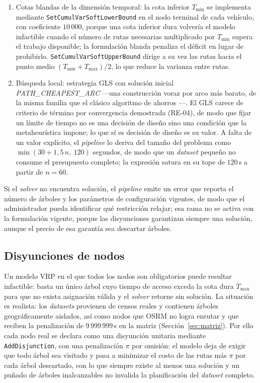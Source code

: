 \begin{enumerate}
  \item Cotas blandas de la dimensión temporal: la cota inferior $T_{\min}$ se implementa mediante
        \texttt{SetCumulVarSoftLowerBound} en el nodo terminal de cada vehículo, con coeficiente
        $10\,000$, porque una cota inferior dura volvería el modelo infactible cuando el número de
        rutas necesarias multiplicado por $T_{\min}$ supera el trabajo disponible; la formulación
        blanda penaliza el déficit en lugar de prohibirlo. \texttt{SetCumulVarSoftUpperBound}
        dirige a su vez las rutas hacia el punto medio $(T_{\min} + T_{\max})/2$, lo que reduce la
        varianza entre rutas.
  \item Búsqueda local: estrategia GLS \citep{voudouris1999guided} con solución inicial
        \textit{PATH\_CHEAPEST\_ARC} ---una construcción voraz por arco más barato, de la misma
        familia que el clásico algoritmo de ahorros \citep{clarke1964scheduling}---. El GLS carece
        de criterio de término por convergencia demostrada (RE-04), de modo que fijar un límite de
        tiempo no es una decisión de diseño sino una condición que la metaheurística impone; lo que
        sí es decisión de diseño es su valor. A falta de un valor explícito, el \textit{pipeline}
        lo deriva del tamaño del problema como $\min(30 + 1{,}5\,n,\ 120)$ segundos, de modo que un
        \textit{dataset} pequeño no consume el presupuesto completo; la expresión satura en su tope
        de $120$\,s a partir de $n = 60$.
\end{enumerate}

Si el \textit{solver} no encuentra solución, el \textit{pipeline} emite un error que reporta el
número de árboles y los parámetros de configuración vigentes, de modo que el administrador pueda
identificar qué restricción relajar; esa rama no se activa con la formulación vigente, porque las
disyunciones garantizan siempre una solución, aunque el precio de esa garantía sea descartar
árboles.

\subsection{Disyunciones de nodos}
\label{sec:disyunciones}

Un modelo VRP en el que todos los nodos son obligatorios puede resultar infactible: basta un único
árbol cuyo tiempo de acceso exceda la cota dura $T_{\max}$ para que no exista asignación válida y
el \textit{solver} retorne sin solución. La situación es realista: los \textit{datasets} provienen
de censos reales y contienen árboles geográficamente aislados, así como nodos que OSRM no logra
enrutar y que reciben la penalización de $9\,999\,999$\,s en la matriz (Sección~\ref{sec:matriz}).
Por ello cada nodo real se declara como una disyunción unitaria mediante \texttt{AddDisjunction},
con una penalización $\pi$ por omisión: el modelo deja de exigir que todo árbol sea visitado y pasa
a minimizar el costo de las rutas más $\pi$ por cada árbol descartado, con lo que siempre existe al
menos una solución y un puñado de árboles inalcanzables no invalida la planificación del
\textit{dataset} completo.

